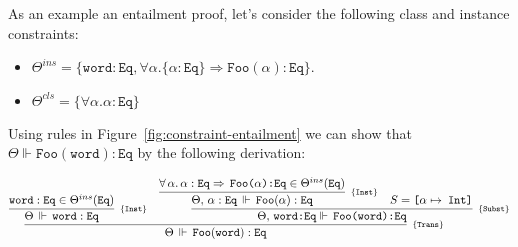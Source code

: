 \documentclass[a4paper, 11pt]{article}
\theoremstyle{definition}
\begin{document}
\begin{Example}
As an example an entailment proof, let's consider the following class
and instance constraints:
\begin{itemize}
  \item $\Theta^{ins} = \{\mathtt{word}:\mathtt{Eq}, \forall \alpha. \{\alpha:\mathtt{Eq}\}\Rightarrow \mathtt{Foo}(\alpha):\mathtt{Eq}\}$.
  \item $\Theta^{cls} =\{\forall \alpha . \alpha : \mathtt{Eq}\}$
\end{itemize}

Using rules in Figure~\ref{fig:constraint-entailment} we can show
that $\Theta\Vdash \mathtt{Foo}(\mathtt{word}) : \mathtt{Eq}$
by the following derivation:

\[
  \infer[_{\{\mathtt{Trans}\}}]
		{\Theta\,\Vdash\,\mathtt{Foo(word):Eq}}
		{
      \infer[_{\{\mathtt{Inst}\}}]
				{\Theta\,\Vdash\,\mathtt{word : Eq}}
				{\mathtt{word : Eq}\in\Theta^{ins}(\texttt{Eq})}
			&
      \infer[_{\{\mathtt{Subst}\}}]
				{\Theta,\,\texttt{word:Eq}\Vdash\,\texttt{Foo(word):Eq}}
				{
          \infer[_{\{\mathtt{Inst}\}}]
            {\Theta,\,\alpha : \texttt{Eq}\,\Vdash\,\mathtt{Foo}(\alpha) : \texttt{Eq}}
						{\forall\,\alpha.\,\alpha : \texttt{Eq}\Rightarrow\,\texttt{Foo($\alpha$):Eq}\in
							\Theta^{ins}(\texttt{Eq})}
					& S = \texttt{[$\alpha\mapsto$ Int]}
				}
		}
\]
\end{Example}
\end{document}
